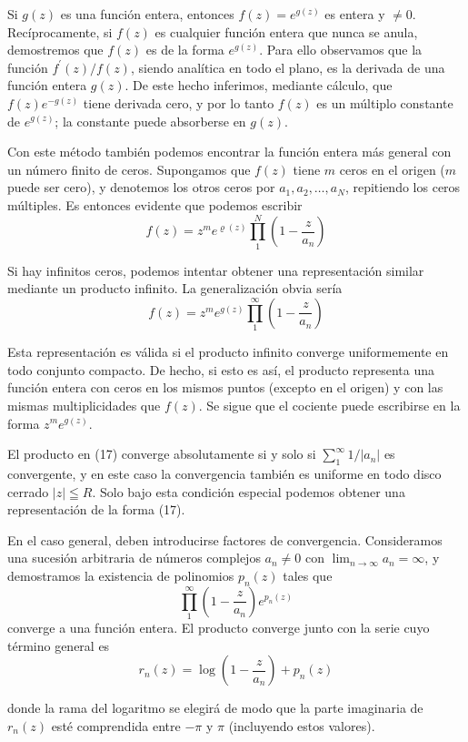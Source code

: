 \documentclass{article}
\theoremstyle{nonumberplain}
\begin{document}
Si \( g(z) \) es una función entera, entonces \( f(z)=e^{g(z)} \) es entera y \( \neq 0 \). Recíprocamente, si \( f(z) \) es cualquier función entera que nunca se anula, demostremos que \( f(z) \) es de la forma \( e^{g(z)} \). Para ello observamos que la función \( f^{\prime}(z) / f(z) \), siendo analítica en todo el plano, es la derivada de una función entera \( g(z) \). De este hecho inferimos, mediante cálculo, que \( f(z) e^{-g(z)} \) tiene derivada cero, y por lo tanto \( f(z) \) es un múltiplo constante de \( e^{g(z)} \); la constante puede absorberse en \( g(z) \).

Con este método también podemos encontrar la función entera más general con un número finito de ceros. Supongamos que \( f(z) \) tiene \( m \) ceros en el origen (\( m \) puede ser cero), y denotemos los otros ceros por \( a_{1}, a_{2}, \ldots, a_{N} \), repitiendo los ceros múltiples. Es entonces evidente que podemos escribir
\[
f(z)=z^{m} e^{\varrho(z)} \prod_{1}^{N}\left(1-\frac{z}{a_{n}}\right)
\]

Si hay infinitos ceros, podemos intentar obtener una representación similar mediante un producto infinito. La generalización obvia sería
\[
f(z)=z^{m} e^{g(z)} \prod_{1}^{\infty}\left(1-\frac{z}{a_{n}}\right)
\]

Esta representación es válida si el producto infinito converge uniformemente en todo conjunto compacto. De hecho, si esto es así, el producto representa una función entera con ceros en los mismos puntos (excepto en el origen) y con las mismas multiplicidades que \( f(z) \). Se sigue que el cociente puede escribirse en la forma \( z^{m} e^{g(z)} \).

El producto en (17) converge absolutamente si y solo si \( \sum_{1}^{\infty} 1 /\left|a_{n}\right| \) es convergente, y en este caso la convergencia también es uniforme en todo disco cerrado \( |z| \leqq R \). Solo bajo esta condición especial podemos obtener una representación de la forma (17).

En el caso general, deben introducirse factores de convergencia. Consideramos una sucesión arbitraria de números complejos \( a_{n} \neq 0 \) con \( \lim _{n \rightarrow \infty} a_{n}=\infty \), y demostramos la existencia de polinomios \( p_{n}(z) \) tales que
\[
\prod_{1}^{\infty}\left(1-\frac{z}{a_{n}}\right) e^{p_{n}(z)}
\]
converge a una función entera. El producto converge junto con la serie cuyo término general es
\[
r_{n}(z)=\log \left(1-\frac{z}{a_{n}}\right)+p_{n}(z)
\]

donde la rama del logaritmo se elegirá de modo que la parte imaginaria de \( r_{n}(z) \) esté comprendida entre \( -\pi \) y \( \pi \) (incluyendo estos valores).
\end{document}
